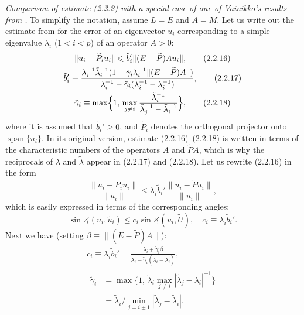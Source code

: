 \documentclass[11pt,oneside]{book}
\newcommand{\myspan}{\operatorname{span}}
\newcommand{\ang}{\measuredangle}
\begin{document}
\textit{Comparison of estimate (2.2.2) with a special case of one of Vainikko's results from \citep{Krasnoselskii1969}.} To simplify the notation, assume $L = E$ and $A = M$. Let us write out the estimate from \citep{Krasnoselskii1969} for the error of an eigenvector $u_i$ corresponding to a simple eigenvalue $\lambda_i$ ($1 < i < p$) of an operator $A > 0$:
\begin{gather*}
\| u_i - \widetilde{P}_i u_i \| \leqslant \tilde{b}_i' \| (E - \widetilde{P}) A u_i \| , \tag{2.2.16} \\
\tilde{b}_i' \equiv \frac{\lambda_i^{-1} \tilde{\lambda}_i^{-1} (1 + \tilde{\gamma}_i \lambda_i^{-1} \| (E - \widetilde{P}) A \|)}{\lambda_i^{-1} - \tilde{\gamma}_i (\tilde{\lambda}_i^{-1} - \lambda_i^{-1})} , \tag{2.2.17} \\
\tilde{\gamma}_i \equiv \max \Bigl\{ 1, \, \max_{j \neq i} \frac{\tilde{\lambda}_i^{-1}}{\tilde{\lambda}_j^{-1} - \tilde{\lambda}_i^{-1}} \Bigr\} , \tag{2.2.18} %
\end{gather*}
where it is assumed that $\tilde{b}_i' \geqslant 0$, and $\widetilde{P}_i$ denotes the orthogonal projector onto $\myspan\{\tilde{u}_i\}$. In its original version, estimate (2.2.16)--(2.2.18) is written in terms of the characteristic numbers of the operators $A$ and $\widetilde{P}A$, which is why the reciprocals of $\lambda$ and $\tilde{\lambda}$ appear in (2.2.17) and (2.2.18). Let us rewrite (2.2.16) in the form
\[
\frac{\| u_i - \widetilde{P}_i u_i \|}{\| u_i \|} \leqslant \lambda_i \tilde{b}_i' \frac{\| u_i - \widetilde{P} u_i \|}{\| u_i \|} ,
\]
which is easily expressed in terms of the corresponding angles:
\[
\sin \ang(u_i, \tilde{u}_i) \leqslant c_i \sin \ang(u_i, \widetilde{U}), \quad c_i \equiv \lambda_i \tilde{b}_i' . \tag{2.2.19}
\]
Next we have (setting $\beta \equiv \| (E - \widetilde{P}) A \|$):
\begin{gather*}
c_i \equiv \lambda_i \tilde{b}_i' = \frac{\lambda_i + \tilde{\gamma}_i \beta}{\tilde{\lambda}_i - \tilde{\gamma}_i (\lambda_i - \tilde{\lambda}_i)} , \tag{2.2.20} \\
\begin{aligned}
\tilde{\gamma}_i &= \max \bigl\{ 1, \, \tilde{\lambda}_i \max_{j \neq i} | \tilde{\lambda}_j - \tilde{\lambda}_i |^{-1} \bigr\} \\
&= \tilde{\lambda}_i / \min_{j = i \pm 1} | \tilde{\lambda}_j - \tilde{\lambda}_i | .
\end{aligned}
\tag{2.2.21}
\end{gather*}
\end{document}
